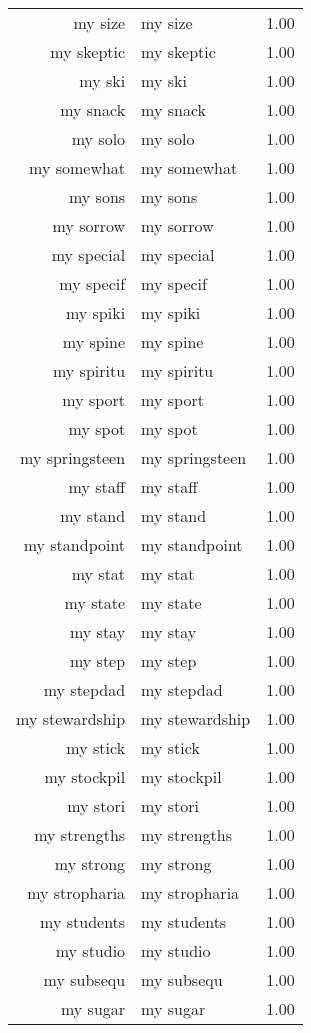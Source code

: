 \begin{table}[ht]
\begin{tabular}{rlr}
  my size & my size & 1.00 \\ 
  my skeptic & my skeptic & 1.00 \\ 
  my ski & my ski & 1.00 \\ 
  my snack & my snack & 1.00 \\ 
  my solo & my solo & 1.00 \\ 
  my somewhat & my somewhat & 1.00 \\ 
  my sons & my sons & 1.00 \\ 
  my sorrow & my sorrow & 1.00 \\ 
  my special & my special & 1.00 \\ 
  my specif & my specif & 1.00 \\ 
  my spiki & my spiki & 1.00 \\ 
  my spine & my spine & 1.00 \\ 
  my spiritu & my spiritu & 1.00 \\ 
  my sport & my sport & 1.00 \\ 
  my spot & my spot & 1.00 \\ 
  my springsteen & my springsteen & 1.00 \\ 
  my staff & my staff & 1.00 \\ 
  my stand & my stand & 1.00 \\ 
  my standpoint & my standpoint & 1.00 \\ 
  my stat & my stat & 1.00 \\ 
  my state & my state & 1.00 \\ 
  my stay & my stay & 1.00 \\ 
  my step & my step & 1.00 \\ 
  my stepdad & my stepdad & 1.00 \\ 
  my stewardship & my stewardship & 1.00 \\ 
  my stick & my stick & 1.00 \\ 
  my stockpil & my stockpil & 1.00 \\ 
  my stori & my stori & 1.00 \\ 
  my strengths & my strengths & 1.00 \\ 
  my strong & my strong & 1.00 \\ 
  my stropharia & my stropharia & 1.00 \\ 
  my students & my students & 1.00 \\ 
  my studio & my studio & 1.00 \\ 
  my subsequ & my subsequ & 1.00 \\ 
  my sugar & my sugar & 1.00 \\ 

\end{tabular}
\end{table}
